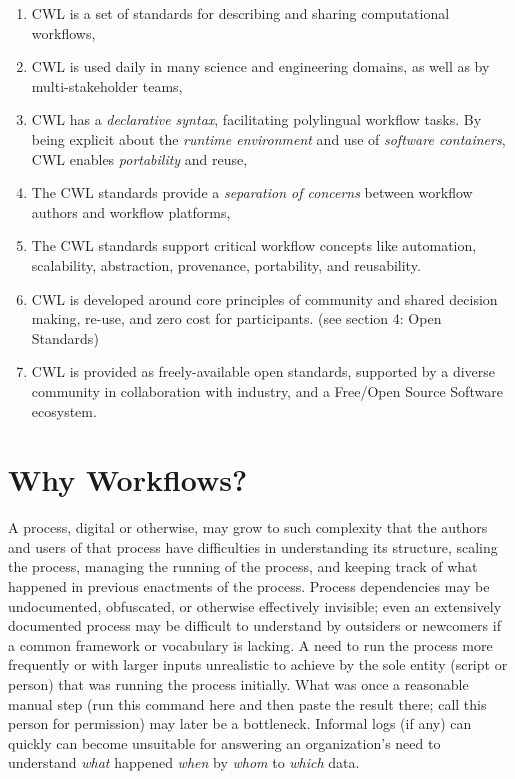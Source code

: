 \documentclass[sigconf,authordraft]{acmart}
\begin{document}
\begin{enumerate}
\item
  {CWL is a set of standards for describing and sharing computational workflows,}
\item
  {CWL is used daily in many science and engineering domains, as well as by multi-stakeholder teams,}
\item
  {CWL has a \textit{declarative syntax}, facilitating polylingual workflow tasks. By being explicit about the \textit{runtime environment} and use of \textit{software containers}, CWL enables \textit{portability} and reuse,}
\item
  {The CWL standards provide a\textit{ separation of concerns} between workflow authors and workflow platforms,}
\item
  {The CWL standards support critical workflow concepts like automation, scalability, abstraction, provenance, portability, and reusability.}
\item
  {CWL is developed around core principles of community and shared decision making, re-use, and zero cost for participants.  (see section 4: Open Standards)}
\item
  {CWL is provided as freely-available open standards, supported by a diverse community in collaboration with industry, and a Free/Open Source Software ecosystem.}
\end{enumerate}

\section{Why Workflows?}

A process, digital or otherwise, may grow to such complexity that the authors and users of that process have difficulties in understanding its structure, scaling the process, managing the running of the process, and keeping track of what happened in previous enactments of the process. Process dependencies may be undocumented, obfuscated, or otherwise effectively invisible; even an extensively documented process may be difficult to understand by outsiders or newcomers if a common framework or vocabulary is lacking. A need to run the process more frequently or with larger inputs unrealistic to achieve by the sole entity (script or person) that was running the process initially. What was once a reasonable manual step (run this command here and then paste the result there; call this person for permission) may later be a bottleneck. Informal logs (if any) can quickly can become unsuitable for answering an organization's need to understand \textit{what} happened \textit{when} by \textit{whom} to \textit{which} data.
\end{document}
